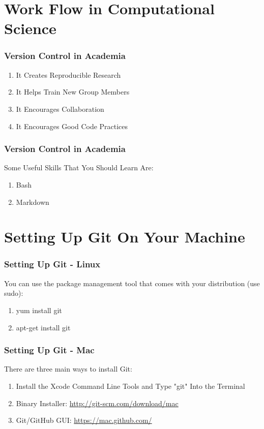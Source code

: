 \section[SciComp Work Flow]{Work Flow in Computational Science}

\begin{frame}
\frametitle{\large{Version Control in Academia}}
\begin{enumerate}
\item It Creates Reproducible Research
\item It Helps Train New Group Members
\item It Encourages Collaboration
\item It Encourages Good Code Practices
\end{enumerate}
\end{frame}

\begin{frame}
\frametitle{\large{Version Control in Academia}}
Some Useful Skills That You Should Learn Are:
\begin{enumerate}
\item Bash
\item Markdown
\end{enumerate}
\end{frame}


\section[Setting Up Git]{Setting Up Git On Your Machine}

\begin{frame}
\frametitle{\large{Setting Up Git - Linux}}
You can use the package management tool that comes with your distribution (use sudo):
\begin{enumerate}
\item yum install git
\item apt-get install git
\end{enumerate}
\end{frame}

\begin{frame}
\frametitle{\large{Setting Up Git - Mac}}
There are three main ways to install Git:
\begin{enumerate}
\item Install the Xcode Command Line Tools and Type "git" Into the Terminal
\item Binary Installer: \href{http://git-scm.com/download/mac}{http://git-scm.com/download/mac}
\item Git/GitHub GUI: \href{https://mac.github.com/}{https://mac.github.com/}
\end{enumerate}
\end{frame}

